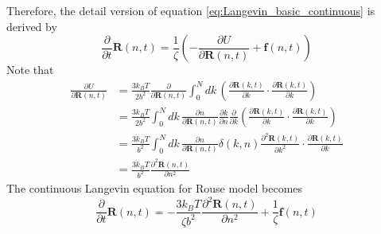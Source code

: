 \documentclass[10pt, a4paper]{article}
\begin{document}
Therefore, the detail version of equation \eqref{eq:Langevin_basic_continuous} is derived by
\begin{equation}
\frac{\partial}{\partial t}\mathbf{R}(n, t) = \frac{1}{\zeta}\left(-\frac{\partial U}{\partial \mathbf{R}(n, t)} + \mathbf{f}(n, t)\right)
\end{equation}
Note that
\begin{align}
\frac{\partial U}{\partial \mathbf{R}(n, t)} &= \frac{3k_BT}{2b^2}\frac{\partial}{\partial \mathbf{R}(n,t)}\int_0^N dk\,\left(\frac{\partial \mathbf{R}(k, t)}{\partial k}\cdot\frac{\partial \mathbf{R}(k, t)}{\partial k}\right)\\
&= \frac{3k_BT}{2b^2}\int_0^N dk\,\frac{\partial n}{\partial \mathbf{R}(n,t)}\frac{\partial k}{\partial n}\frac{\partial}{\partial k}\left(\frac{\partial \mathbf{R}(k, t)}{\partial k}\cdot\frac{\partial \mathbf{R}(k, t)}{\partial k}\right)\\
&= \frac{3k_BT}{b^2}\int_0^N dk\,\frac{\partial n}{\partial \mathbf{R}(n,t)}\delta(k,n)\frac{\partial^2 \mathbf{R}(k, t)}{\partial k^2}\cdot\frac{\partial \mathbf{R}(k, t)}{\partial k}\\
&= \frac{3k_BT}{b^2}\frac{\partial^2 \mathbf{R}(n, t)}{\partial n^2}
\end{align}
The continuous Langevin equation for Rouse model becomes
\begin{equation}
\frac{\partial}{\partial t}\mathbf{R}(n, t) = -\frac{3k_BT}{\zeta b^2}\frac{\partial^2 \mathbf{R}(n,t)}{\partial n^2} + \frac{1}{\zeta}\mathbf{f}(n,t)
\label{eq:Langevin_continuous_Rouse}
\end{equation}
\end{document}
